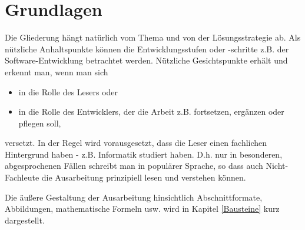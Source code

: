 \chapter{Grundlagen}

Die Gliederung hängt natürlich vom Thema und von der Lösungsstrategie ab. Als nützliche Anhaltspunkte können die Entwicklungsstufen oder -schritte z.B. der Software-Entwicklung betrachtet werden. Nützliche Gesichtspunkte erhält und erkennt man, wenn man sich

\begin{itemize}
	\item in die Rolle des Lesers oder
	\item in die Rolle des Entwicklers, der die Arbeit z.B. fortsetzen, ergänzen oder pflegen soll,
\end{itemize}

versetzt. In der Regel wird vorausgesetzt, dass die Leser einen fachlichen Hintergrund haben - z.B. Informatik studiert haben. D.h. nur in besonderen, abgesprochenen Fällen schreibt man in populärer Sprache, so dass auch Nicht-Fachleute die Ausarbeitung prinzipiell lesen und verstehen können.

Die äußere Gestaltung der Ausarbeitung hinsichtlich Abschnittformate, Abbildungen, mathematische Formeln usw. wird in Kapitel \ref{Bausteine} kurz dargestellt.
